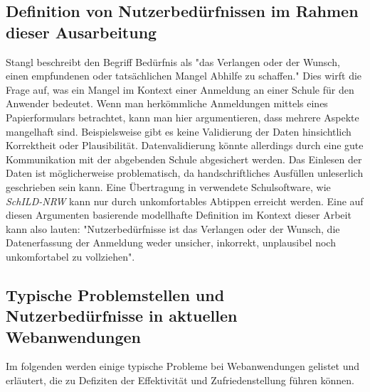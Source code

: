 \subsection{Definition von Nutzerbedürfnissen im Rahmen dieser Ausarbeitung }
\cite{stangl} 
Stangl beschreibt den Begriff Bedürfnis als "das Verlangen oder der Wunsch, einen empfundenen oder tatsächlichen Mangel Abhilfe zu schaffen."\cite{stangl} Dies wirft die Frage auf, was ein Mangel im Kontext einer Anmeldung an einer Schule für den Anwender bedeutet. Wenn man herkömmliche Anmeldungen mittels eines Papierformulars betrachtet, kann man hier argumentieren, dass mehrere Aspekte mangelhaft sind. Beispielsweise gibt es keine Validierung der Daten hinsichtlich Korrektheit oder Plausibilität.  Datenvalidierung könnte allerdings durch eine gute Kommunikation mit der abgebenden Schule abgesichert werden. Das Einlesen der Daten ist möglicherweise problematisch, da handschriftliches Ausfüllen unleserlich geschrieben sein kann. Eine Übertragung in verwendete Schulsoftware, wie \textit{SchILD-NRW} kann nur durch unkomfortables Abtippen erreicht werden.
Eine auf diesen Argumenten basierende modellhafte Definition im Kontext dieser Arbeit kann also lauten: "Nutzerbedürfnisse ist das Verlangen oder der Wunsch, die Datenerfassung der Anmeldung weder unsicher, inkorrekt, unplausibel noch unkomfortabel zu vollziehen".

\subsection{Typische Problemstellen und Nutzerbedürfnisse in aktuellen Webanwendungen}
Im folgenden werden einige typische Probleme bei Webanwendungen gelistet und erläutert, die zu Defiziten der Effektivität und Zufriedenstellung führen können.

